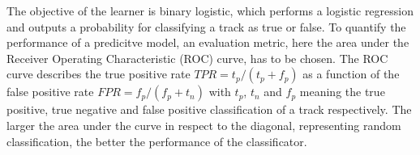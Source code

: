 The objective of the learner is binary logistic, which performs a logistic regression and outputs a probability for classifying a track as true or false.
To quantify the performance of a predicitve model, an evaluation metric, here the area under the Receiver Operating Characteristic (ROC) curve, has to be chosen.
The ROC curve describes the true positive rate $TPR = t_p/(t_p + f_p)$ as a function of the false positive rate $FPR = f_p/(f_p + t_n)$ with
$t_p$, $t_n$ and $f_p$ meaning the true positive, true negative and false positive classification of a track respectively. The larger the area under the curve in respect
to the diagonal, representing random classification, the better the performance of the classificator.
